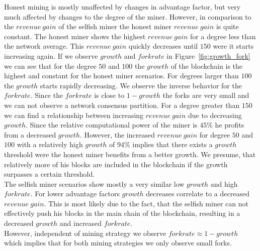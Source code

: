 Honest mining is mostly unaffected by changes in advantage factor, but very much affected by changes to the degree of the miner. However, in comparison to the $revenue~gain$ of the selfish miner the honest miner $revenue~gain$ is quite constant. The honest miner shows the highest $revenue~gain$ for a degree less than the network average. This $revenue~gain$ quickly decreases until $150$ were it starts increasing again. If we observe $growth$ and $forkrate$ in Figure~\ref{fig:growth_fork} we can see that for the degree $50$ and $100$ the $growth$ of the blockchain is the highest and constant for the honest miner scenarios. For degrees larger than $100$ the $growth$ starts rapidly decreasing. We observe the inverse behavior for the $forkrate$. Since the $forkrate$ is close to $1-growth$ the forks are very small and we can not observe a network consensus partition. For a degree greater than $150$ we can find a relationship between increasing $revenue~gain$ due to decreasing $growth$. Since the relative computational power of the miner is $45\% $ he profits from a decreased $growth$. However, the increased $revenue~gain$ for degree $50$ and $100$ with a relatively high $growth$ of $94\% $ implies that there exists a $growth$ threshold were the honest miner benefits from a better growth. We presume, that relatively more of his blocks are included in the blockchain if the growth surpasses a certain threshold.\\
The selfish miner scenarios show mostly a very similar low $growth$ and high $forkrate$. For lower advantage factors $growth$ decreases correlate to a decreased $revenue~gain$. This is most likely due to the fact, that the selfish miner can not effectively push his blocks in the main chain of the blockchain, resulting in a decreased $growth$ and increased $forkrate$.\\
However, independent of mining strategy we observe $forkrate \approx 1-growth$ which implies that for both mining strategies we only observe small forks.



















